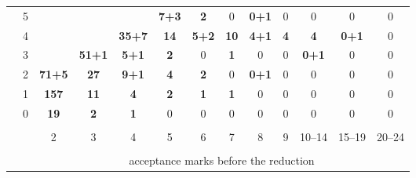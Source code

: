\begin{tabular}{cc|ccccccccccc|}
 & 
5
 & 
\footnotesize{}
 & 
\footnotesize{}
 & 
\footnotesize{}
 & 
\footnotesize{\cellcolor{blue!8}\textbf{7+3}}
 & 
\footnotesize{\cellcolor{blue!5}\textbf{2}}
 & 
\footnotesize{0}
 & 
\footnotesize{\cellcolor{blue!5}\textbf{0+1}}
 & 
\footnotesize{0}
 & 
\footnotesize{0}
 & 
\footnotesize{0}
 & 
\footnotesize{0}
\\
 & 
4
 & 
\footnotesize{}
 & 
\footnotesize{}
 & 
\footnotesize{\cellcolor{blue!19}\textbf{35+7}}
 & 
\footnotesize{\cellcolor{blue!9}\textbf{14}}
 & 
\footnotesize{\cellcolor{blue!7}\textbf{5+2}}
 & 
\footnotesize{\cellcolor{blue!8}\textbf{10}}
 & 
\footnotesize{\cellcolor{blue!6}\textbf{4+1}}
 & 
\footnotesize{\cellcolor{blue!6}\textbf{4}}
 & 
\footnotesize{\cellcolor{blue!6}\textbf{4}}
 & 
\footnotesize{\cellcolor{blue!5}\textbf{0+1}}
 & 
\footnotesize{0}
\\
 & 
3
 & 
\footnotesize{}
 & 
\footnotesize{\cellcolor{blue!22}\textbf{51+1}}
 & 
\footnotesize{\cellcolor{blue!7}\textbf{5+1}}
 & 
\footnotesize{\cellcolor{blue!5}\textbf{2}}
 & 
\footnotesize{0}
 & 
\footnotesize{\cellcolor{blue!5}\textbf{1}}
 & 
\footnotesize{0}
 & 
\footnotesize{0}
 & 
\footnotesize{\cellcolor{blue!5}\textbf{0+1}}
 & 
\footnotesize{0}
 & 
\footnotesize{0}
\\
 & 
2
 & 
\footnotesize{\cellcolor{blue!30}\textbf{71+5}}
 & 
\footnotesize{\cellcolor{blue!14}\textbf{27}}
 & 
\footnotesize{\cellcolor{blue!8}\textbf{9+1}}
 & 
\footnotesize{\cellcolor{blue!6}\textbf{4}}
 & 
\footnotesize{\cellcolor{blue!5}\textbf{2}}
 & 
\footnotesize{0}
 & 
\footnotesize{\cellcolor{blue!5}\textbf{0+1}}
 & 
\footnotesize{0}
 & 
\footnotesize{0}
 & 
\footnotesize{0}
 & 
\footnotesize{0}
\\
 & 
1
 & 
\footnotesize{\cellcolor{blue!57}\textcolor{black!10}{\textbf{157}}}
 & 
\footnotesize{\cellcolor{blue!8}\textbf{11}}
 & 
\footnotesize{\cellcolor{blue!6}\textbf{4}}
 & 
\footnotesize{\cellcolor{blue!5}\textbf{2}}
 & 
\footnotesize{\cellcolor{blue!5}\textbf{1}}
 & 
\footnotesize{\cellcolor{blue!5}\textbf{1}}
 & 
\footnotesize{0}
 & 
\footnotesize{0}
 & 
\footnotesize{0}
 & 
\footnotesize{0}
 & 
\footnotesize{0}
\\
 & 
0
 & 
\footnotesize{\cellcolor{blue!11}\textbf{19}}
 & 
\footnotesize{\cellcolor{blue!5}\textbf{2}}
 & 
\footnotesize{\cellcolor{blue!5}\textbf{1}}
 & 
\footnotesize{0}
 & 
\footnotesize{0}
 & 
\footnotesize{0}
 & 
\footnotesize{0}
 & 
\footnotesize{0}
 & 
\footnotesize{0}
 & 
\footnotesize{0}
 & 
\footnotesize{0}
\\
\cline{3-13}\vspace{-10pt}\\
\multicolumn{2}{c}{}
 & 
2
 & 
3
 & 
4
 & 
5
 & 
6
 & 
7
 & 
8
 & 
9
 & 
10--14
 & 
15--19
 & 
\multicolumn{1}{c}{20--24}

\\
\vspace{-10pt}\\
\multicolumn{2}{c}{} & \multicolumn{11}{c}{acceptance marks before the reduction} \\
\end{tabular}

